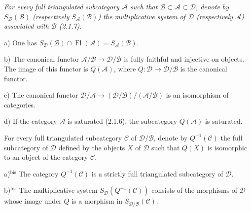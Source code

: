\clearpage
{}%
\begingroup
\small
\setlength{\parskip}{0pt}%
\setlength{\emergencystretch}{1.5em}%

\begingroup\itshape
{}%
For every full triangulated subcategory $\mathcal A$ such that
$\mathcal B\subset\mathcal A\subset\mathcal D$, denote by
$S_{\mathcal D}(\mathcal B)$ (respectively $S_{\mathcal A}(\mathcal B)$)
the multiplicative system of $\mathcal D$ (respectively $\mathcal A$)
associated with $\mathcal B$ (2.1.7).

\par\noindent a) One has
$S_{\mathcal D}(\mathcal B)\cap\operatorname{Fl}(\mathcal A)
=S_{\mathcal A}(\mathcal B)$.

\par\noindent b) The canonical functor
$\mathcal A/\mathcal B\longrightarrow\mathcal D/\mathcal B$ is fully
faithful and injective on objects. The image of this functor is
$Q(\mathcal A)$, where
$Q\colon\mathcal D\longrightarrow\mathcal D/\mathcal B$ is the canonical
functor.

\par\noindent c) The canonical functor
$\mathcal D/\mathcal A\longrightarrow
(\mathcal D/\mathcal B)/(\mathcal A/\mathcal B)$ is an isomorphism of
categories.

\par\noindent d) If the category $\mathcal A$ is saturated (2.1.6), the
subcategory $Q(\mathcal A)$ is saturated.

For every full triangulated subcategory $\mathcal C$ of
$\mathcal D/\mathcal B$, denote by $Q^{-1}(\mathcal C)$ the full
subcategory of $\mathcal D$ defined by the objects $X$ of $\mathcal D$
such that $Q(X)$ is isomorphic to an object of the category $\mathcal C$.

\par\noindent a)$^{\mathrm{bis}}$ The category $Q^{-1}(\mathcal C)$ is a
strictly full triangulated subcategory of $\mathcal D$.

\par\noindent b)$^{\mathrm{bis}}$ The multiplicative system
$S_{\mathcal D}(Q^{-1}(\mathcal C))$ consists of the morphisms of
$\mathcal D$ whose image under $Q$ is a morphism in
$S_{\mathcal D/\mathcal B}(\mathcal C)$.

